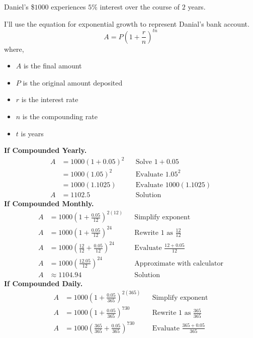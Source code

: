 \begin{solution}[title=Solution 5]
    Daniel's \$$1000$ experiences $5\%$ interest over the course of $2$ years.

    I'll use the equation for exponential growth to represent Danial's bank account.
    \[
        A = P\left(1 + \frac{r}{n}\right)^{tn}
    \]
    where,
    \begin{itemize}
        \item $A$ is the final amount
        \item $P$ is the original amount deposited
        \item $r$ is the interest rate
        \item $n$ is the compounding rate
        \item $t$ is years
    \end{itemize}
    \textbf{If Compounded Yearly.}
    \begin{align*}
        A &= 1000(1 + 0.05)^2 && \text{Solve $1 + 0.05$}\\
        &= 1000(1.05)^2 &&\text{Evaluate $1.05^2$}\\
        &= 1000(1.1025) && \text{Evaluate $1000(1.1025)$} \\
        A &= 1102.5 && \text{Solution}
    \end{align*}
    \textbf{If Compounded Monthly.}
    \begin{align*}
        A &= 1000\left(1 + \frac{0.05}{12}\right)^{2(12)} &&
        \text{Simplify exponent} \\
        A &= 1000\left(1 + \frac{0.05}{12}\right)^{24} &&
        \text{Rewrite $1$ as $\frac{12}{12}$} \\
        A &= 1000\left(\frac{12}{12} + \frac{0.05}{12}\right)^{24} &&
        \text{Evaluate $\frac{12 + 0.05}{12}$} \\
        A &= 1000\left(\frac{12.05}{12}\right)^{24} &&
        \text{Approximate with calculator} \\
        A &\approx 1104.94 && \text{Solution}
    \end{align*}
    \textbf{If Compounded Daily.}
    \begin{align*}
        A &= 1000\left(1 + \frac{0.05}{365}\right)^{2(365)} &&
        \text{Simplify exponent} \\
        A &= 1000\left(1 + \frac{0.05}{365}\right)^{730} &&
        \text{Rewrite $1$ as $\frac{365}{365}$} \\
        A &= 1000\left(\frac{365}{365} + \frac{0.05}{365}\right)^{730} &&
        \text{Evaluate $\frac{365 + 0.05}{365}$} \\

\end{align*}
\end{solution}
